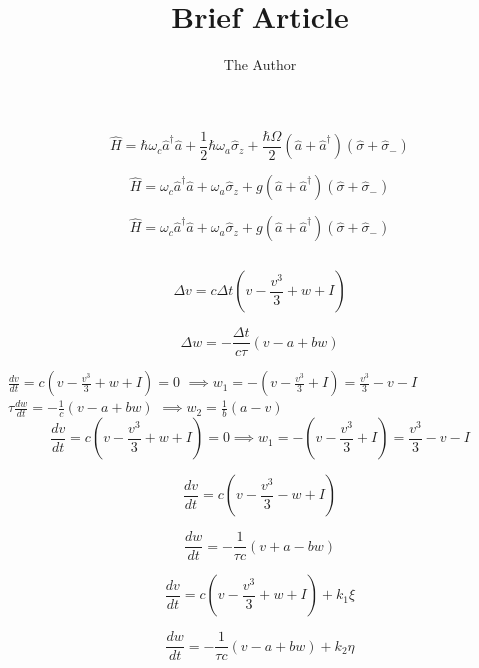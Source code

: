 \documentclass[11pt, oneside]{article}   	%
\title{Brief Article}
\author{The Author}
\begin{document}
\maketitle

$$\hat{H}=\hbar \omega_c  \hat{a}^{\dagger} \hat{a} + \frac{1}{2}\hbar \omega_a \hat{\sigma}_z+\frac{\hbar \Omega}{2}  \left(  \hat{a} +    \hat{a}^{\dagger}     \right) \left(  \hat{\sigma} +   \hat{\sigma}_-     \right)$$

$$\hat{H}= \omega_c  \hat{a}^{\dagger} \hat{a} + \omega_a \hat{\sigma}_z+g  \left(  \hat{a} +    \hat{a}^{\dagger}     \right) \left(  \hat{\sigma} +   \hat{\sigma}_-     \right)$$ %

$$\hat{H}= \omega_c  \hat{a}^{\dagger} \hat{a} + \omega_a \hat{\sigma}_z+g  \left(  \hat{a} +    \hat{a}^{\dagger}     \right) \left(  \hat{\sigma} +   \hat{\sigma}_-     \right)$$

$$ $$











$$\Delta v = c \Delta t \left(    v - \frac{v^3}{3} + w + I   \right) $$

$$\Delta w = -\frac{\Delta t}{c \tau} (v - a + bw ) $$

$\frac{dv}{dt}=c \left(  v - \frac{v^3}{3} + w + I \right) =0$
$ \implies w_1=-(v-\frac{v^3}{3}+I)=\frac{v^3}{3}-v-I$ \\
$\tau \frac{dw}{dt}=-\frac{1}{c}(v-a+bw)$
$\implies w_2 = \frac{1}{b}(a-v)$\\

$$\frac{dv}{dt}=c \left(  v - \frac{v^3}{3} + w + I \right) =0 \implies w_1=-(v-\frac{v^3}{3}+I)=\frac{v^3}{3}-v-I $$


$$\frac{dv}{dt}=c \left(  v - \frac{v^3}{3} - w + I \right) $$ 

$$ \frac{dw}{dt}=-\frac{1}{\tau c}(v+a-bw)$$


$$\frac{dv}{dt}=c (  v - \frac{v^3}{3} + w + I ) + k_1 \xi$$ 

$$ \frac{dw}{dt}=-\frac{1}{\tau c}(v-a+bw) + k_2 \eta$$
\end{document}

